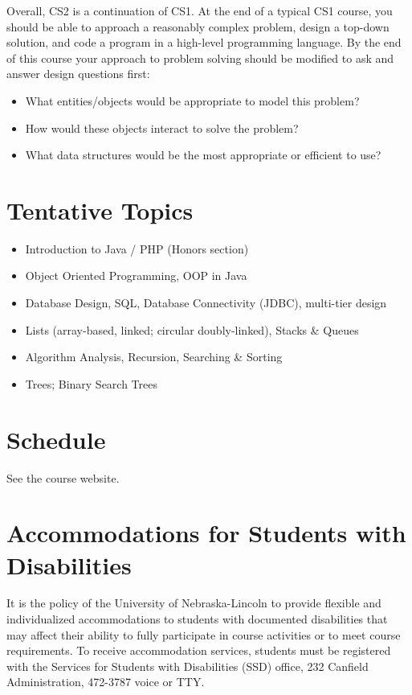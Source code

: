 \documentclass[12pt]{scrartcl}
\begin{document}
Overall, CS2 is a continuation of CS1.  At the end of a typical CS1 
course, you should be able to approach a reasonably complex problem, 
design a top-down solution, and code a program in a high-level 
programming language.  By the end of this course your approach to 
problem solving should be modified to ask and answer design questions 
first: 

\begin{itemize} 
  \item What entities/objects would be appropriate to model this problem?
  \item How would these objects interact to solve the problem?
  \item What data structures would be the most appropriate or efficient to use? 
\end{itemize}

\section{Tentative Topics}

\begin{itemize}
  \item Introduction to Java / PHP (Honors section)
  \item Object Oriented Programming, OOP in Java
  \item Database Design, SQL, Database Connectivity (JDBC), multi-tier design
  \item Lists (array-based, linked; circular doubly-linked), Stacks \& Queues
  \item Algorithm Analysis, Recursion, Searching \& Sorting
  \item Trees; Binary Search Trees
\end{itemize}

\section{Schedule}

See the course website.

\section{Accommodations for Students with Disabilities}

It is the policy of the University of Nebraska-Lincoln to 
provide flexible and individualized accommodations to students 
with documented disabilities that may affect their ability to 
fully participate in course activities or to meet course 
requirements.  To receive accommodation services, students 
must be registered with the Services for Students with 
Disabilities (SSD) office, 232 Canfield Administration, 
472-3787 voice or TTY.
\end{document}
